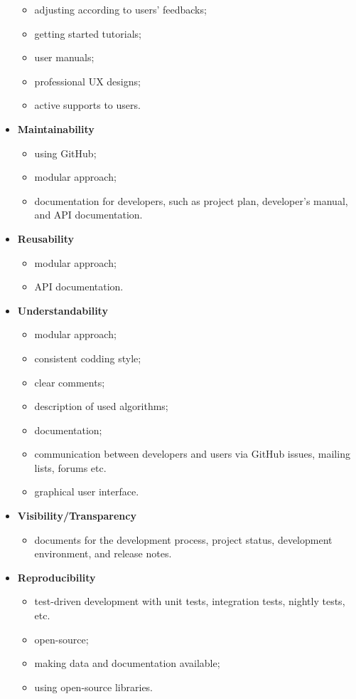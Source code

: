 \begin{itemize}
\begin{itemize}
    \item adjusting according to users’ feedbacks;
    \item getting started tutorials;
    \item user manuals;
    \item professional UX designs;
    \item active supports to users.
\end{itemize}
\item \textbf{Maintainability}
\begin{itemize}
    \item using GitHub;
    \item modular approach;
    \item documentation for developers, such as project plan, developer’s manual, and API documentation.
\end{itemize}
\item \textbf{Reusability}
\begin{itemize}
    \item modular approach;
    \item API documentation.
\end{itemize}
\item \textbf{Understandability}
\begin{itemize}
    \item modular approach;
    \item consistent codding style;
    \item clear comments;
    \item description of used algorithms;
    \item documentation;
    \item communication between developers and users via GitHub issues, mailing lists, forums etc.
    \item graphical user interface.
\end{itemize}
\item \textbf{Visibility/Transparency}
\begin{itemize}
    \item documents for the development process, project status, development environment, and release notes.
\end{itemize}
\item \textbf{Reproducibility}
\begin{itemize}
    \item test-driven development with unit tests, integration tests, nightly tests, etc.
    \item open-source;
    \item making data and documentation available;
    \item using open-source libraries.
\end{itemize}
\end{itemize}

